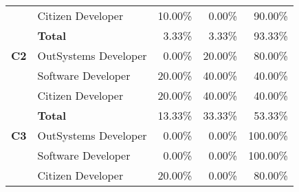 \begin{table}[tb]
\begin{tabular}{llrrr}
                              & Citizen Developer    & 10.00\%                                                           & 0.00\%                                                                  & 90.00\%                                                       \\
                              & \textbf{Total}       & 3.33\%                                                            & 3.33\%                                                                  & 93.33\%                                                       \\ \hline
    \textbf{C2}               & OutSystems Developer & 0.00\%                                                            & 20.00\%                                                                 & 80.00\%                                                       \\
                              & Software Developer   & 20.00\%                                                           & 40.00\%                                                                 & 40.00\%                                                       \\
                              & Citizen Developer    & 20.00\%                                                           & 40.00\%                                                                 & 40.00\%                                                       \\
                              & \textbf{Total}       & 13.33\%                                                           & 33.33\%                                                                 & 53.33\%                                                       \\ \hline
    \textbf{C3}               & OutSystems Developer & 0.00\%                                                            & 0.00\%                                                                  & 100.00\%                                                      \\
                              & Software Developer   & 0.00\%                                                            & 0.00\%                                                                  & 100.00\%                                                      \\
                              & Citizen Developer    & 20.00\%                                                           & 0.00\%                                                                  & 80.00\%                                                       \\

\end{tabular}
\end{table}
